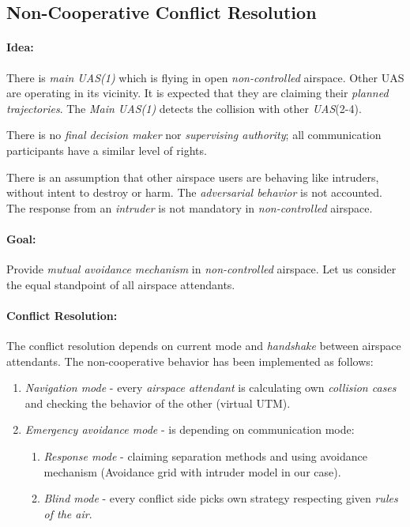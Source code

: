 \subsection{Non-Cooperative Conflict Resolution}\label{sec:nonCooperativeConflictResolution}

\paragraph{Idea:} There is \emph{main UAS(1)} which is flying in open \emph{non-controlled} airspace. Other UAS are operating in its vicinity. It is expected that they are claiming their \emph{planned trajectories}. The \emph{Main UAS(1)} detects the collision with other \emph{UAS}(2-4).

There is no \emph{final decision maker} nor \emph{supervising authority}; all communication participants have a similar level of rights. 
\begin{note}
    There is an assumption that other airspace users are behaving like intruders, without intent to destroy or harm. The \emph{adversarial behavior} is not accounted. The response from an \emph{intruder} is not mandatory in \emph{non-controlled} airspace.
\end{note}

\paragraph{Goal:} Provide \emph{mutual avoidance mechanism} in \emph{non-controlled} airspace. Let us consider the equal standpoint of all airspace attendants.

\paragraph{Conflict Resolution:} The conflict resolution depends on current mode and \emph{handshake} between airspace attendants. The non-cooperative behavior has been implemented as follows:

\begin{enumerate}
    \item\emph{Navigation mode} - every \emph{airspace attendant} is calculating own \emph{collision cases} and checking the behavior of the other (virtual UTM).
    
    \item\emph{Emergency avoidance mode} - is depending on communication mode:
    \begin{enumerate}[a]
        \item\emph{Response mode} - claiming separation methods and using avoidance mechanism (Avoidance grid with intruder model in our case).
        
        \item\emph{Blind mode} - every conflict side picks own strategy respecting given \emph{rules of the air}.
    \end{enumerate}
\end{enumerate}


